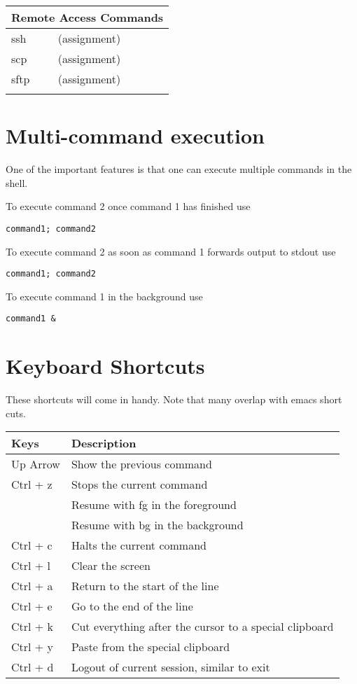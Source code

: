 \begin{center}
\begin{longtable}{|p{4cm}|p{8cm}|}
  \hline
  \multicolumn{2}{|l|}{\cellcolor{blue!15} Remote Access Commands}\\
  \hline
  ssh &  (assignment) \\
  scp &  (assignment) \\
  sftp &  (assignment) \\
  & \\


\end{longtable}
\end{center}

\section{Multi-command execution}

One of the important features is that one can execute multiple
commands in the shell.

To execute command 2 once command 1 has finished use

\begin{verbatim}
command1; command2
\end{verbatim}

To execute command 2 as soon as command 1 forwards output to stdout use

\begin{verbatim}
command1; command2
\end{verbatim}

To execute command 1 in the background use

\begin{verbatim}
command1 &
\end{verbatim}



\section{Keyboard Shortcuts}\label{keyboard-shortcuts}

These shortcuts will come in handy. Note that many overlap with emacs
short cuts.

\begin{tabular}{ll}
Keys     & Description  \\
\hline
Up Arrow & Show the previous command\\
Ctrl + z & Stops the current command  \\
         & Resume with fg in the foreground \\
         & Resume with bg in the background \\
Ctrl + c & Halts the current command\\
Ctrl + l & Clear the screen\\
Ctrl + a & Return to the start of the line\\
Ctrl + e & Go to the end of the line\\
Ctrl + k & Cut everything after the cursor to a special clipboard\\
Ctrl + y & Paste from the special clipboard \\
Ctrl + d & Logout of current session, similar to exit \\
\end{tabular}

